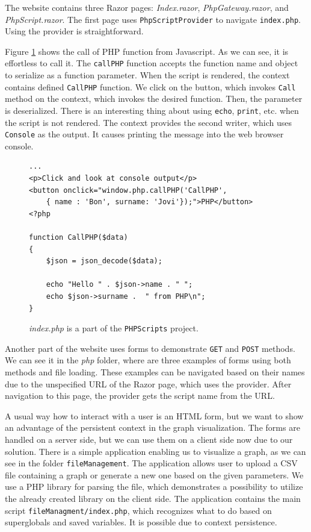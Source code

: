 The website contains three Razor pages: \textit{Index.razor}, \textit{PhpGateway.razor}, and \textit{PhpScript.razor}.
The first page uses \texttt{PhpScriptProvider} to navigate \texttt{index.php}.
Using the provider is straightforward.
\par
Figure \ref{img26:index} shows the call of PHP function from Javascript.
As we can see, it is effortless to call it.
The \texttt{callPHP} function accepts the function name and object to serialize as a function parameter.
When the script is rendered, the context contains defined \texttt{CallPHP} function.
We click on the button, which invokes \texttt{Call} method on the context, which invokes the desired function.
Then, the parameter is deserialized.
There is an interesting thing about using \texttt{echo}, \texttt{print}, etc. when the script is not rendered.
The context provides the second writer, which uses \texttt{Console} as the output.
It causes printing the message into the web browser console.
\begin{figure}
\begin{lstlisting}
...
<p>Click and look at console output</p>
<button onclick="window.php.callPHP('CallPHP',
	{ name : 'Bon', surname: 'Jovi'});">PHP</button>
<?php

function CallPHP($data)
{
    $json = json_decode($data); 

	echo "Hello " . $json->name . " ";
	echo $json->surname .  " from PHP\n";
}
\end{lstlisting}
\caption{\textit{index.php} is a part of the \texttt{PHPScripts} project.}
\label{img26:index}
\end{figure}
\par
Another part of the website uses forms to demonstrate \texttt{GET} and \texttt{POST} methods.
We can see it in the \textit{php} folder, where are three examples of forms using both methods and file loading.
These examples can be navigated based on their names due to the unspecified URL of the Razor page, which uses the provider.
After navigation to this page, the provider gets the script name from the URL.
\par
A usual way how to interact with a user is an HTML form, but we want to show an advantage of the persistent context in the graph visualization.
The forms are handled on a server side, but we can use them on a client side now due to our solution.
There is a simple application enabling us to visualize a graph, as we can see in the folder \texttt{fileManagement}.
The application allows user to upload a CSV file containing a graph or generate a new one based on the given parameters.
We use a PHP library for parsing the file, which demonstrates a possibility to utilize the already created library on the client side.
The application contains the main script \texttt{fileManagment/index.php}, which recognizes what to do based on superglobals and saved variables.
It is possible due to context persistence.

